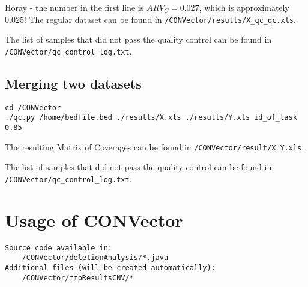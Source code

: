 \documentclass{article}
\begin{document}
Horay - the number in the first line is $ARV_C = 0.027$, which is approximately $0.025$! The regular dataset can be found in \texttt{/CONVector/results/X\_qc\_qc.xls}.

The list of samples that did not pass the quality control can be found in \texttt{/CONVector/qc\_control\_log.txt}.





\subsection{Merging two datasets}

\hypertarget{mergingDatasets}{}

\begin{usecase}
\end{usecase}

\begin{lstlisting}[style=DOS, caption={How merge Test Dataset X and Control Dataset Y}]
cd /CONVector
./qc.py /home/bedfile.bed ./results/X.xls ./results/Y.xls id_of_task 0.85
\end{lstlisting}

The resulting Matrix of Coverages can be found in \texttt{/CONVector/result/X\_Y.xls}.

The list of samples that did not pass the quality control can be found in \texttt{/CONVector/qc\_control\_log.txt}.





\newpage
\section{Usage of CONVector}
\begin{verbatim}
Source code available in:
    /CONVector/deletionAnalysis/*.java
Additional files (will be created automatically):
    /CONVector/tmpResultsCNV/*
\end{verbatim}
\end{document}
